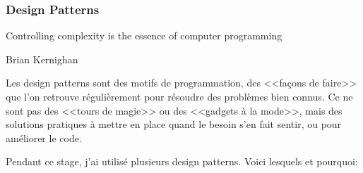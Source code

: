 \documentclass[a4paper,french,12pt]{article}
\begin{document}
	    
	  \subsubsection{Design Patterns}
	      \epigraph{Controlling complexity is the essence of computer programming}{Brian Kernighan}
	      
	      
	      
	    Les design patterns sont des motifs de programmation, des <<façons de faire>> que l'on retrouve régulièrement 
	    pour résoudre des problèmes bien connus. Ce ne sont pas des <<tours de magie>> ou des  <<gadgets à la mode>>,
	    mais des solutions pratiques à mettre en place quand le besoin s'en fait sentir, ou pour améliorer le code.
	    
	    Pendant ce stage, j'ai utilisé plusieurs design patterns. Voici lesquels et pourquoi:
	    
\end{document}
